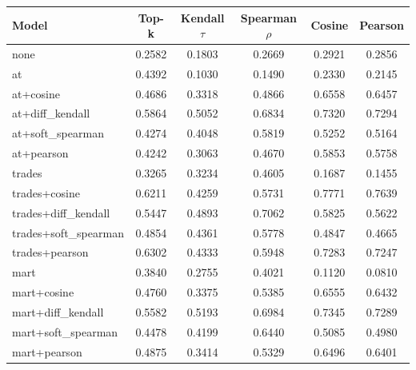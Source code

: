 \begin{tabular}{lccccc}
\toprule
Model & Top-k & Kendall $\tau$ & Spearman $\rho$ & Cosine & Pearson \\
\midrule
none & 0.2582 & 0.1803 & 0.2669 & 0.2921 & 0.2856 \\
at & 0.4392 & 0.1030 & 0.1490 & 0.2330 & 0.2145 \\
at+cosine & 0.4686 & 0.3318 & 0.4866 & 0.6558 & 0.6457 \\
at+diff_kendall & 0.5864 & 0.5052 & 0.6834 & 0.7320 & 0.7294 \\
at+soft_spearman & 0.4274 & 0.4048 & 0.5819 & 0.5252 & 0.5164 \\
at+pearson & 0.4242 & 0.3063 & 0.4670 & 0.5853 & 0.5758 \\
trades & 0.3265 & 0.3234 & 0.4605 & 0.1687 & 0.1455 \\
trades+cosine & 0.6211 & 0.4259 & 0.5731 & 0.7771 & 0.7639 \\
trades+diff_kendall & 0.5447 & 0.4893 & 0.7062 & 0.5825 & 0.5622 \\
trades+soft_spearman & 0.4854 & 0.4361 & 0.5778 & 0.4847 & 0.4665 \\
trades+pearson & 0.6302 & 0.4333 & 0.5948 & 0.7283 & 0.7247 \\
mart & 0.3840 & 0.2755 & 0.4021 & 0.1120 & 0.0810 \\
mart+cosine & 0.4760 & 0.3375 & 0.5385 & 0.6555 & 0.6432 \\
mart+diff_kendall & 0.5582 & 0.5193 & 0.6984 & 0.7345 & 0.7289 \\
mart+soft_spearman & 0.4478 & 0.4199 & 0.6440 & 0.5085 & 0.4980 \\
mart+pearson & 0.4875 & 0.3414 & 0.5329 & 0.6496 & 0.6401 \\
\bottomrule
\end{tabular}
